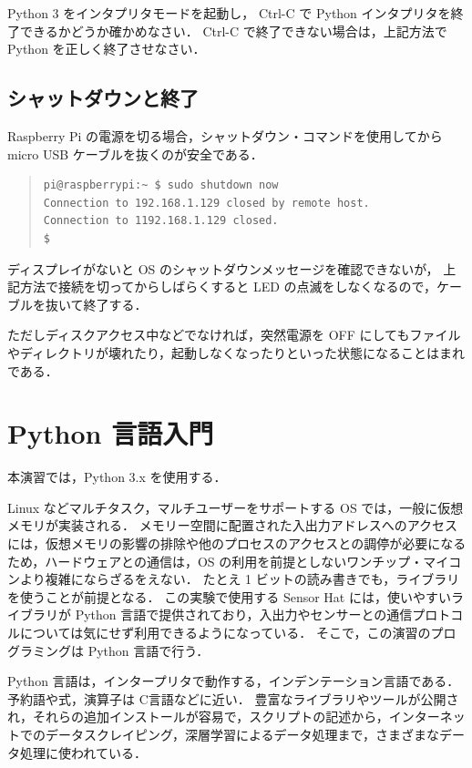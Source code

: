 \documentclass[11pt,a4,epsf]{article}
\begin{document}
\begin{excercise}
Python 3 をインタプリタモードを起動し，
Ctrl-C で Python  インタプリタを終了できるかどうか確かめなさい．
Ctrl-C で終了できない場合は，上記方法で Python を正しく終了させなさい．
\end{excercise}

\subsection{シャットダウンと終了}

Raspberry Pi の電源を切る場合，シャットダウン・コマンドを使用してから micro USB ケーブルを抜くのが安全である．
\begin{quote}
\small
\begin{verbatim}
pi@raspberrypi:~ $ sudo shutdown now
Connection to 192.168.1.129 closed by remote host.
Connection to 1192.168.1.129 closed.
$ 
\end{verbatim}
\end{quote}
ディスプレイがないと OS のシャットダウンメッセージを確認できないが，
上記方法で接続を切ってからしばらくすると LED の点滅をしなくなるので，ケーブルを抜いて終了する．

ただしディスクアクセス中などでなければ，突然電源を OFF にしてもファイルやディレクトリが壊れたり，起動しなくなったりといった状態になることはまれである．



\section{Python 言語入門}

本演習では，Python 3.x を使用する．

Linux などマルチタスク，マルチユーザーをサポートする OS では，一般に仮想メモリが実装される．
メモリー空間に配置された入出力アドレスへのアクセスには，仮想メモリの影響の排除や他のプロセスのアクセスとの調停が必要になるため，ハードウェアとの通信は，OS の利用を前提としないワンチップ・マイコンより複雑にならざるをえない．
たとえ 1 ビットの読み書きでも，ライブラリを使うことが前提となる．
この実験で使用する Sensor Hat には，使いやすいライブラリが Python 言語で提供されており，入出力やセンサーとの通信プロトコルについては気にせず利用できるようになっている．
そこで，この演習のプログラミングは Python 言語で行う．

Python 言語は，インタープリタで動作する，インデンテーション言語である．
予約語や式，演算子は C言語などに近い．
豊富なライブラリやツールが公開され，それらの追加インストールが容易で，スクリプトの記述から，インターネットでのデータスクレイピング，深層学習によるデータ処理まで，さまざまなデータ処理に使われている．
\end{document}
